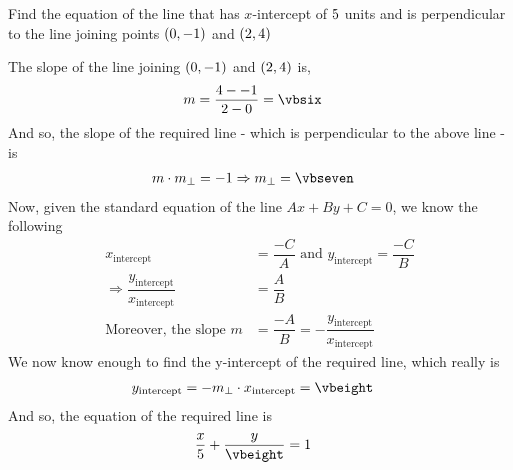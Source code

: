 \question Find the equation of the line that has $x$-intercept of $5$ units and is perpendicular
to the line joining points $(0, -1)$ and $(2, 4)$

\insertQR[-20pt]{}

\watchout

\ifprintanswers
\fi 

\begin{solution}
	The slope of the line joining $(0, -1)$ and $(2, 4)$ is,
	\begin{align}
		m &= \dfrac{\vbfour-\vbtwo}{\vbthree-\vbone} = \vbsix
	\end{align}
	And so, the slope of the required line - which is perpendicular to the above line - is 
	\begin{align}
		m\cdot m_{\perp} &= -1 \Rightarrow m_{\perp} = \vbseven
	\end{align}
	Now, given the standard equation of the line $Ax + By + C = 0$, we know the following
	\begin{align}
		x_{\text{intercept}} &= \dfrac{-C}{A} \text{ and } y_{\text{intercept}} = \dfrac{-C}{B} \\
		\Rightarrow \dfrac{y_{\text{intercept}}}{x_{\text{intercept}}} &= \dfrac{A}{B} \\
		\text{Moreover, the slope } m &= \dfrac{-A}{B} = -\dfrac{y_{\text{intercept}}}{x_{\text{intercept}}}
	\end{align}
    We now know enough to find the y-intercept of the required line, which really is
    \begin{align}
    	y_{\text{intercept}} &= -m_{\perp}\cdot x_{\text{intercept}} = \vbeight
    \end{align}
    And so, the equation of the required line is 
    \begin{align}
    	\dfrac{x}{\vbfive} + \dfrac{y}{\vbeight} &= 1
    \end{align}
\end{solution}
